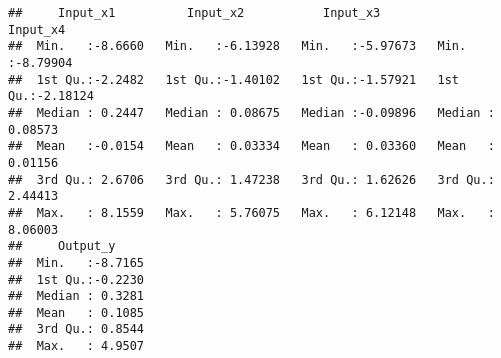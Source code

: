 \documentclass[
]{article}
\newenvironment{Shaded}{\begin{snugshade}}{\end{snugshade}}
\newcommand{\AttributeTok}[1]{\textcolor[rgb]{0.77,0.63,0.00}{#1}}
\newcommand{\CommentTok}[1]{\textcolor[rgb]{0.56,0.35,0.01}{\textit{#1}}}
\newcommand{\DecValTok}[1]{\textcolor[rgb]{0.00,0.00,0.81}{#1}}
\newcommand{\FloatTok}[1]{\textcolor[rgb]{0.00,0.00,0.81}{#1}}
\newcommand{\FunctionTok}[1]{\textcolor[rgb]{0.00,0.00,0.00}{#1}}
\newcommand{\NormalTok}[1]{#1}
\newcommand{\OtherTok}[1]{\textcolor[rgb]{0.56,0.35,0.01}{#1}}
\newcommand{\SpecialCharTok}[1]{\textcolor[rgb]{0.00,0.00,0.00}{#1}}
\begin{document}
\begin{verbatim}
##     Input_x1          Input_x2           Input_x3           Input_x4       
##  Min.   :-8.6660   Min.   :-6.13928   Min.   :-5.97673   Min.   :-8.79904  
##  1st Qu.:-2.2482   1st Qu.:-1.40102   1st Qu.:-1.57921   1st Qu.:-2.18124  
##  Median : 0.2447   Median : 0.08675   Median :-0.09896   Median : 0.08573  
##  Mean   :-0.0154   Mean   : 0.03334   Mean   : 0.03360   Mean   : 0.01156  
##  3rd Qu.: 2.6706   3rd Qu.: 1.47238   3rd Qu.: 1.62626   3rd Qu.: 2.44413  
##  Max.   : 8.1559   Max.   : 5.76075   Max.   : 6.12148   Max.   : 8.06003  
##     Output_y      
##  Min.   :-8.7165  
##  1st Qu.:-0.2230  
##  Median : 0.3281  
##  Mean   : 0.1085  
##  3rd Qu.: 0.8544  
##  Max.   : 4.9507
\end{verbatim}

\begin{Shaded}
\end{Shaded}
\end{document}
